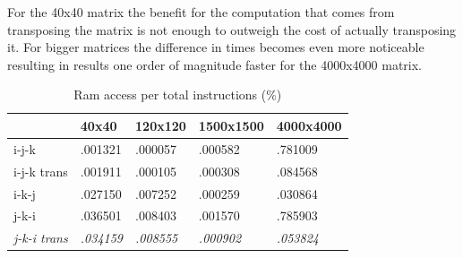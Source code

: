 \documentclass[a4paper]{report}
\begin{document}
For the 40x40 matrix the benefit for the computation that comes from transposing
the matrix is not enough to outweigh the cost of actually transposing it. For
bigger matrices the difference in times becomes even more noticeable resulting in
results one order of magnitude faster for the 4000x4000 matrix.

\begin{table}[H]
\centering
\begin{tabular}{|l|l|l|l|l|}
\hline
            & 40x40   & 120x120 & 1500x1500 & 4000x4000 \\ \hline
i-j-k       & .001321 & .000057 & .000582   & .781009   \\ \hline
i-j-k trans & .001911 & .000105 & .000308   & .084568   \\ \hline
i-k-j       & .027150 & .007252 & .000259   & .030864   \\ \hline
j-k-i       & .036501 & .008403 & .001570   & .785903   \\ \hline
\textit{j-k-i trans} & \textit{.034159} & \textit{.008555} & \textit{.000902}
                     & \textit{.053824}   \\ \hline
\end{tabular}
\caption{Ram access per total instructions (\%)}
\end{table}
\end{document}
